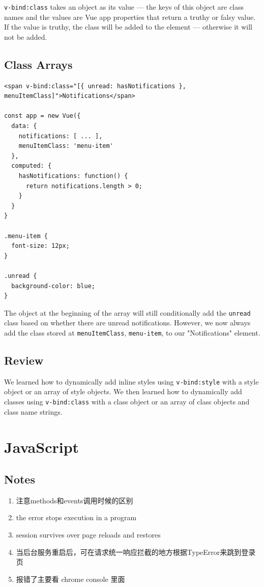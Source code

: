 \documentclass[a4paper, 12pt]{article}
\begin{document}
\verb|v-bind:class| takes an object as its value — the keys of this object are class names and the values are Vue app properties that return a truthy or falsy value. If the value is truthy, the class will be added to the element — otherwise it will not be added.

\subsection{Class Arrays}
\begin{verbatim}
<span v-bind:class="[{ unread: hasNotifications }, menuItemClass]">Notifications</span>

const app = new Vue({
  data: { 
    notifications: [ ... ],
    menuItemClass: 'menu-item'
  },
  computed: {
    hasNotifications: function() {
      return notifications.length > 0;
    }
  }
}

.menu-item {
  font-size: 12px;
}

.unread {
  background-color: blue;
}
\end{verbatim}
The object at the beginning of the array will still conditionally add the \verb|unread| class based on whether there are unread notifications. However, we now always add the class stored at \verb|menuItemClass|, \verb|menu-item|, to our "Notifications" element.

\subsection{Review}
We learned how to dynamically add inline styles using \verb|v-bind:style| with a style object or an array of style objects. We then learned how to dynamically add classes using \verb|v-bind:class| with a class object or an array of class objects and class name strings.


\section{JavaScript}

\subsection{Notes}
\begin{enumerate}
\item 注意methods和events调用时候的区别

\item the error stops execution in a program

\item session survives over page reloads and restores

\item 当后台服务重启后，可在请求统一响应拦截的地方根据TypeError来跳到登录页

\item 报错了主要看 chrome console 里面

\end{enumerate}
\end{document}

